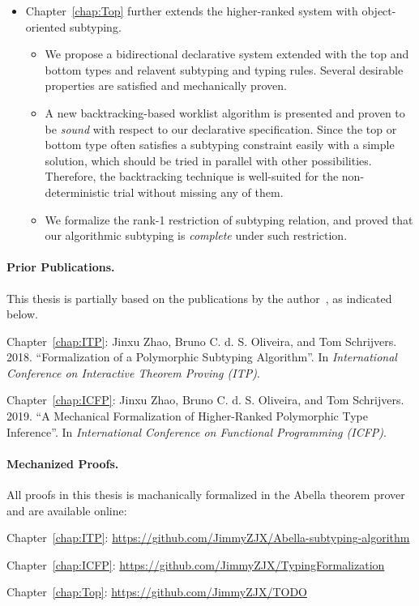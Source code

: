 \begin{itemize}
  \item Chapter~\ref{chap:Top}
    further extends the higher-ranked system with object-oriented subtyping.
    \begin{itemize}
      \item We propose a bidirectional declarative system extended with
        the top and bottom types and relavent subtyping and typing rules.
        Several desirable properties are satisfied and mechanically proven.
      \item A new backtracking-based worklist algorithm is presented and
        proven to be \emph{sound} with respect to our declarative specification.
        Since the top or bottom type often satisfies a subtyping constraint easily
        with a simple solution, which should be tried in parallel with other possibilities.
        Therefore, the backtracking technique is well-suited for the
        non-deterministic trial without missing any of them.
      \item We formalize the rank-1 restriction of subtyping relation,
        and proved that our algorithmic subtyping is \emph{complete} under such restriction.
    \end{itemize}
\end{itemize}



\paragraph{Prior Publications.}
This thesis is partially based on the publications by the author~\citep{itp2018,icfp2019},
as indicated below.
\begin{description}
\item Chapter~\ref{chap:ITP}: Jinxu Zhao, Bruno C. d. S. Oliveira, and Tom Schrijvers. 2018.
  ``Formalization of a Polymorphic Subtyping Algorithm''.
  In \emph{International Conference on Interactive Theorem Proving (ITP)}.
\item Chapter~\ref{chap:ICFP}: Jinxu Zhao, Bruno C. d. S. Oliveira, and Tom Schrijvers. 2019.
  ``A Mechanical Formalization of Higher-Ranked Polymorphic Type Inference''.
  In \emph{International Conference on Functional Programming (ICFP)}.
\end{description}

\paragraph{Mechanized Proofs.}
All proofs in this thesis is machanically formalized in the Abella theorem prover
and are available online:
\begin{description}
  \item Chapter~\ref{chap:ITP}: \url{https://github.com/JimmyZJX/Abella-subtyping-algorithm}
  \item Chapter~\ref{chap:ICFP}: \url{https://github.com/JimmyZJX/TypingFormalization}
  \item Chapter~\ref{chap:Top}: \url{https://github.com/JimmyZJX/TODO}
\end{description}

\noindent\makebox[\linewidth]{\rule{0.7\textwidth}{0.4pt}}

\vspace{1.5\baselineskip}



